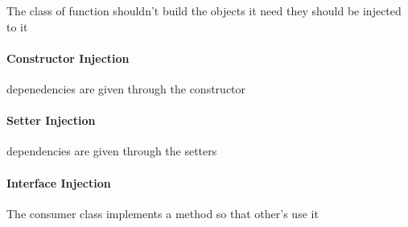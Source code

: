 \documentclass[a4paper]{article}
\title{}
\date{}
\begin{document}
    \maketitle
    The class of function shouldn't build the objects it need they should be injected to it
    
    \paragraph{Constructor Injection}
        depenedencies are given through the constructor
    
    \paragraph{Setter Injection}
        dependencies are given through the setters
    
    \paragraph{Interface Injection}
        The consumer class implements a method so that other's use it
\end{document}
